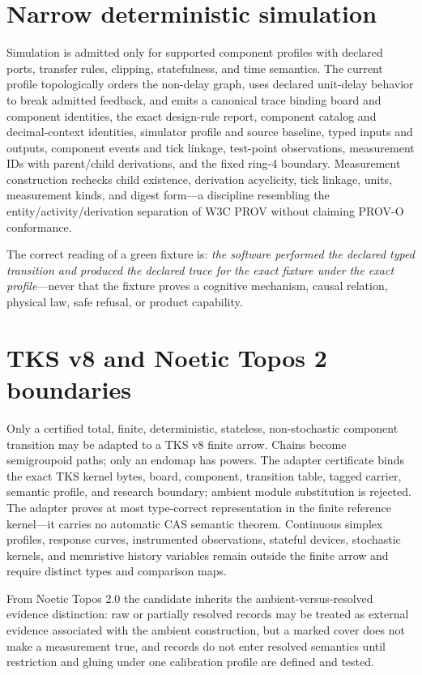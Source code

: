 \documentclass[11pt]{amsart}
\theoremstyle{definition}
\theoremstyle{remark}
\begin{document}
\section{Narrow deterministic simulation}

Simulation is admitted only for supported component profiles with declared ports, transfer rules, clipping, statefulness, and time semantics. The current profile topologically orders the non-delay graph, uses declared unit-delay behavior to break admitted feedback, and emits a canonical trace binding board and component identities, the exact design-rule report, component catalog and decimal-context identities, simulator profile and source baseline, typed inputs and outputs, component events and tick linkage, test-point observations, measurement IDs with parent/child derivations, and the fixed ring-4 boundary. Measurement construction rechecks child existence, derivation acyclicity, tick linkage, units, measurement kinds, and digest form---a discipline resembling the entity/activity/derivation separation of W3C PROV \cite{prov} without claiming PROV-O conformance.

The correct reading of a green fixture is: \emph{the software performed the declared typed transition and produced the declared trace for the exact fixture under the exact profile}---never that the fixture proves a cognitive mechanism, causal relation, physical law, safe refusal, or product capability.

\section{TKS v8 and Noetic Topos 2 boundaries}

Only a certified total, finite, deterministic, stateless, non-stochastic component transition may be adapted to a TKS v8 finite arrow. Chains become semigroupoid paths; only an endomap has powers. The adapter certificate binds the exact TKS kernel bytes, board, component, transition table, tagged carrier, semantic profile, and research boundary; ambient module substitution is rejected. The adapter proves at most type-correct representation in the finite reference kernel---it carries no automatic CAS semantic theorem. Continuous simplex profiles, response curves, instrumented observations, stateful devices, stochastic kernels, and memristive history variables remain outside the finite arrow and require distinct types and comparison maps.

From Noetic Topos 2.0 the candidate inherits the ambient-versus-resolved evidence distinction: raw or partially resolved records may be treated as external evidence associated with the ambient construction, but a marked cover does not make a measurement true, and records do not enter resolved semantics until restriction and gluing under one calibration profile are defined and tested.
\end{document}
